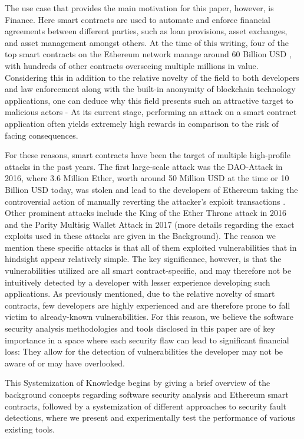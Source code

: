 \documentclass[letterpaper,twocolumn,10pt]{article}
\begin{document}
The use case that provides the main motivation for this paper, however, is Finance. Here smart contracts are used to automate and enforce financial agreements between different parties, such as loan provisions, asset exchanges, and asset management amongst others. At the time of this writing, four of the top smart contracts on the Ethereum network manage around 60 Billion USD \cite{nr1} \cite{nr2} \cite{nr1T} \cite{nr2T}, with hundreds of other contracts overseeing multiple millions in value. Considering this in addition to the relative novelty of the field to both developers and law enforcement along with the built-in anonymity of blockchain technology applications, one can deduce why this field presents such an attractive target to malicious actors - At its current stage, performing an attack on a smart contract application often yields extremely high rewards in comparison to the risk of facing consequences. 

For these reasons, smart contracts have been the target of multiple high-profile attacks in the past years. The first large-scale attack was the DAO-Attack in 2016, where 3.6 Million Ether, worth around 50 Million USD at the time or 10 Billion USD today,  was stolen and lead to the developers of Ethereum taking the controversial action of manually reverting the attacker's exploit transactions \cite{atzei_bartoletti_cimoli_2017}. Other prominent attacks include the King of the Ether Throne attack in 2016 and the Parity Multisig Wallet Attack in 2017 \cite{atzei_bartoletti_cimoli_2017}(more details regarding the exact exploits used in these attacks are given in the Background). The reason we mention these specific attacks is that all of them exploited vulnerabilities that in hindsight appear relatively simple. The key significance, however, is that the vulnerabilities utilized are all smart contract-specific, and may therefore not be intuitively detected by a developer with lesser experience developing such applications. As previously mentioned, due to the relative novelty of smart contracts, few developers are highly experienced and are therefore prone to fall victim to already-known vulnerabilities. For this reason, we believe the software security analysis methodologies and tools disclosed in this paper are of key importance in a space where each security flaw can lead to significant financial loss: They allow for the detection of vulnerabilities the developer may not be aware of or may have overlooked. 

This Systemization of Knowledge begins by giving a brief overview of the background concepts regarding software security analysis and Ethereum smart contracts, followed by a systemization of different approaches to security fault detections, where we present and experimentally test the performance of various existing tools. 
\end{document}
